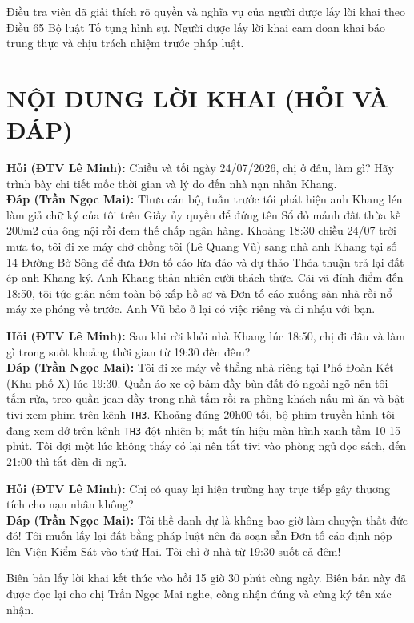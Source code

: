 \documentclass[12pt,a4paper]{article}
\begin{document}
\noindent Điều tra viên đã giải thích rõ quyền và nghĩa vụ của người được lấy lời khai theo Điều 65 Bộ luật Tố tụng hình sự. Người được lấy lời khai cam đoan khai báo trung thực và chịu trách nhiệm trước pháp luật.

\section*{NỘI DUNG LỜI KHAI (HỎI VÀ ĐÁP)}

\noindent \textbf{Hỏi (ĐTV Lê Minh):} Chiều và tối ngày 24/07/2026, chị ở đâu, làm gì? Hãy trình bày chi tiết mốc thời gian và lý do đến nhà nạn nhân Khang.\\
\textbf{Đáp (Trần Ngọc Mai):} Thưa cán bộ, tuần trước tôi phát hiện anh Khang lén làm giả chữ ký của tôi trên Giấy ủy quyền để đứng tên Sổ đỏ mảnh đất thừa kế 200m2 của ông nội rồi đem thế chấp ngân hàng. Khoảng 18:30 chiều 24/07 trời mưa to, tôi đi xe máy chở chồng tôi (Lê Quang Vũ) sang nhà anh Khang tại số 14 Đường Bờ Sông để đưa Đơn tố cáo lừa đảo và dự thảo Thỏa thuận trả lại đất ép anh Khang ký. Anh Khang thản nhiên cười thách thức. Cãi vã đỉnh điểm đến 18:50, tôi tức giận ném toàn bộ xấp hồ sơ và Đơn tố cáo xuống sàn nhà rồi nổ máy xe phóng về trước. Anh Vũ bảo ở lại có việc riêng và đi nhậu với bạn.

\noindent \textbf{Hỏi (ĐTV Lê Minh):} Sau khi rời khỏi nhà Khang lúc 18:50, chị đi đâu và làm gì trong suốt khoảng thời gian từ 19:30 đến đêm?\\
\textbf{Đáp (Trần Ngọc Mai):} Tôi đi xe máy về thẳng nhà riêng tại Phố Đoàn Kết (Khu phố X) lúc 19:30. Quần áo xe cộ bám đầy bùn đất đỏ ngoài ngõ nên tôi tắm rửa, treo quần jean dầy trong nhà tắm rồi ra phòng khách nấu mì ăn và bật tivi xem phim trên kênh \texttt{TH3}. Khoảng đúng 20h00 tối, bộ phim truyền hình tôi đang xem dở trên kênh \texttt{TH3} đột nhiên bị mất tín hiệu màn hình xanh tầm 10-15 phút. Tôi đợi một lúc không thấy có lại nên tắt tivi vào phòng ngủ đọc sách, đến 21:00 thì tắt đèn đi ngủ.

\noindent \textbf{Hỏi (ĐTV Lê Minh):} Chị có quay lại hiện trường hay trực tiếp gây thương tích cho nạn nhân không?\\
\textbf{Đáp (Trần Ngọc Mai):} Tôi thề danh dự là không bao giờ làm chuyện thất đức đó! Tôi muốn lấy lại đất bằng pháp luật nên đã soạn sẵn Đơn tố cáo định nộp lên Viện Kiểm Sát vào thứ Hai. Tôi chỉ ở nhà từ 19:30 suốt cả đêm!

\noindent Biên bản lấy lời khai kết thúc vào hồi 15 giờ 30 phút cùng ngày. Biên bản này đã được đọc lại cho chị Trần Ngọc Mai nghe, công nhận đúng và cùng ký tên xác nhận.
\end{document}
